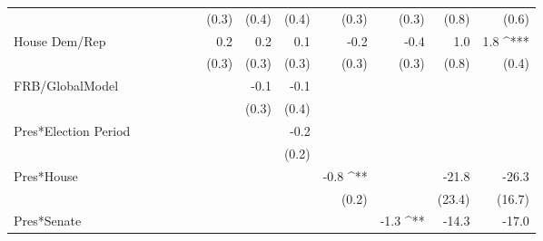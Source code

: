 \documentclass[a4paper]{article}\usepackage{graphicx, color}
\begin{document}
\begin{table}[ht]
\begin{center}
{\begin{tabular}{ l D{.}{.}{1}D{.}{.}{1}D{.}{.}{1}D{.}{.}{1}D{.}{.}{1}D{.}{.}{1}D{.}{.}{1}D{.}{.}{1}D{.}{.}{1}D{.}{.}{1}D{.}{.}{1}D{.}{.}{1} }
                     &                 &                 &                 &                 &                 & (0.3)           & (0.4)           & (0.4)           & (0.3)           & (0.3)           & (0.8)           & (0.6)          \\ 
House Dem/Rep        &                 &                 &                 &                 &                 & 0.2             & 0.2             & 0.1             & -0.2            & -0.4            & 1.0             & 1.8 ^{***}     \\ 
                     &                 &                 &                 &                 &                 & (0.3)           & (0.3)           & (0.3)           & (0.3)           & (0.3)           & (0.8)           & (0.4)          \\ 
FRB/GlobalModel      &                 &                 &                 &                 &                 &                 & -0.1            & -0.1            &                 &                 &                 &                \\ 
                     &                 &                 &                 &                 &                 &                 & (0.3)           & (0.4)           &                 &                 &                 &                \\ 
Pres*Election Period &                 &                 &                 &                 &                 &                 &                 & -0.2            &                 &                 &                 &                \\ 
                     &                 &                 &                 &                 &                 &                 &                 & (0.2)           &                 &                 &                 &                \\ 
Pres*House           &                 &                 &                 &                 &                 &                 &                 &                 & -0.8 ^{**}      &                 & -21.8           & -26.3          \\ 
                     &                 &                 &                 &                 &                 &                 &                 &                 & (0.2)           &                 & (23.4)          & (16.7)         \\ 
Pres*Senate          &                 &                 &                 &                 &                 &                 &                 &                 &                 & -1.3 ^{**}      & -14.3           & -17.0          \\ 

\end{tabular}}
\end{center}
\end{table}
\end{document}
